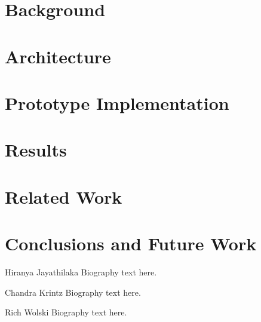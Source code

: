 \documentclass[10pt,journal,compsoc]{IEEEtran}
\begin{document}
\maketitle

\IEEEdisplaynontitleabstractindextext

\IEEEpeerreviewmaketitle





\section{Background}
\label{sec:background}


\section{Architecture}
\label{sec:arch}


\section{Prototype Implementation}
\label{sec:impl}


\section{Results}
\label{sec:results}


\section{Related Work}


\section{Conclusions and Future Work}


%
 

\begin{IEEEbiography}{Hiranya Jayathilaka}
Biography text here.
\end{IEEEbiography}

\begin{IEEEbiography}{Chandra Krintz}
Biography text here.
\end{IEEEbiography}

\begin{IEEEbiography}{Rich Wolski}
Biography text here.
\end{IEEEbiography}
\end{document}
